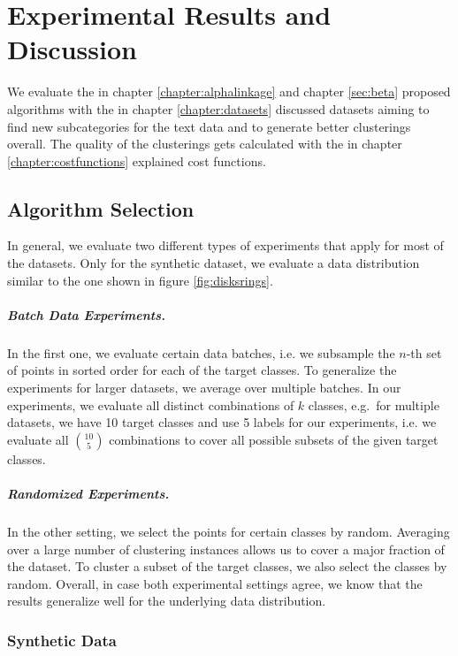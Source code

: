 \chapter{Experimental Results and Discussion}
\label{sec:results}

We evaluate the in chapter \ref{chapter:alphalinkage} and chapter \ref{sec:beta} proposed algorithms with the in chapter \ref{chapter:datasets} discussed datasets aiming to find new subcategories for the text data and to generate better clusterings overall. The quality of the clusterings gets calculated with the in chapter \ref{chapter:costfunctions} explained cost functions.

\section{Algorithm Selection}

In general, we evaluate two different types of experiments that apply for most of the datasets. Only for the synthetic dataset, we evaluate a data distribution similar to the one shown in figure \ref{fig:disksrings}.

\paragraph{Batch Data Experiments.} In the first one, we evaluate certain data batches, i.e. we subsample the $n$-th set of points in sorted order for each of the target classes. To generalize the experiments for larger datasets, we average over multiple batches. In our experiments, we evaluate all distinct combinations of $k$ classes, e.g.\ for multiple datasets, we have 10 target classes and use 5 labels for our experiments, i.e. we evaluate all $10 \choose 5$ combinations to cover all possible subsets of the given target classes.

\paragraph{Randomized Experiments.} In the other setting, we select the points for certain classes by random. Averaging over a large number of clustering instances allows us to cover a major fraction of the dataset. To cluster a subset of the target classes, we also select the classes by random. Overall, in case both experimental settings agree, we know that the results generalize well for the underlying data distribution.

\subsection{Synthetic Data} 

